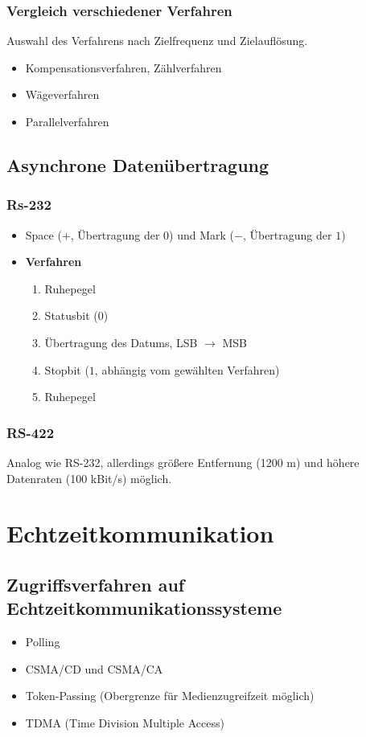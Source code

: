 \subsubsection{Vergleich verschiedener Verfahren}
Auswahl des Verfahrens nach Zielfrequenz und Zielauflösung.
\begin{itemize}
	\item Kompensationsverfahren, Zählverfahren
	\item Wägeverfahren
	\item Parallelverfahren
\end{itemize}


\subsection{Asynchrone Datenübertragung}

\subsubsection{Rs-232}

\begin{itemize}
	\item Space ($+$, Übertragung der $0$) und Mark ($-$, Übertragung der $1$)
	\item \textbf{Verfahren}
	\begin{enumerate}
		\item Ruhepegel
		\item Statusbit ($0$)
		\item Übertragung des Datums, LSB $\rightarrow$ MSB
		\item Stopbit ($1$, abhängig vom gewählten Verfahren)
		\item Ruhepegel
	\end{enumerate}
\end{itemize}

\subsubsection{RS-422}
Analog wie RS-232, allerdings größere Entfernung (1200 m) und höhere Datenraten (100 kBit/s) möglich.



\section{Echtzeitkommunikation}

\subsection{Zugriffsverfahren auf Echtzeitkommunikationssysteme}
\begin{itemize}
	\item Polling
	\item CSMA/CD und CSMA/CA
	\item Token-Passing (Obergrenze für Medienzugreifzeit möglich)
	\item TDMA (Time Division Multiple Access)
\end{itemize}


